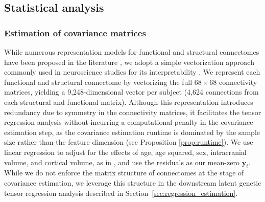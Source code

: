 \documentclass[12pt]{article}
\DeclareMathOperator{\Y}{\mathbf{Y}}
\DeclareMathOperator{\bSigma}{\mathbf{\Sigma}}
\begin{document}


\subsection{Statistical analysis}

\subsubsection{Estimation of covariance matrices} \label{subsec:estimationapplication}

While numerous representation models for functional and structural connectomes have been proposed in the literature \parencite{arsigny2006logeuclideana, arsigny2006geometric, dryden2009noneuclidean, zhang2019tensor, lila2022functional, zhao2022covarianceoncovariance}, we adopt a simple vectorization approach commonly used in neuroscience studies for its interpretability \parencite[see, for example,][]{smith2015linking,xia2018linked}. We represent each functional and structural connectome by vectorizing the full $68 \times 68$ connectivity matrices, yielding a 9,248-dimensional vector per subject (4,624 connections from each structural and functional matrix). Although this representation introduces redundancy due to symmetry in the connectivity matrices, it facilitates the tensor regression analysis without incurring a computational penalty in the covariance estimation step, as the covariance estimation runtime is dominated by the sample size rather than the feature dimension (see Proposition \ref{prop:runtime}). We use linear regression to adjust for the effects of age, age squared, sex, intracranial volume, and cortical volume, as in \textcite{colclough2017heritability}, and use the residuals as our mean-zero $\mathbf y_i$. While we do not enforce the matrix structure of connectomes at the stage of covariance estimation, we leverage this structure in the downstream latent genetic tensor regression analysis described in Section~\ref{sec:regression_estimation}.
\end{document}
